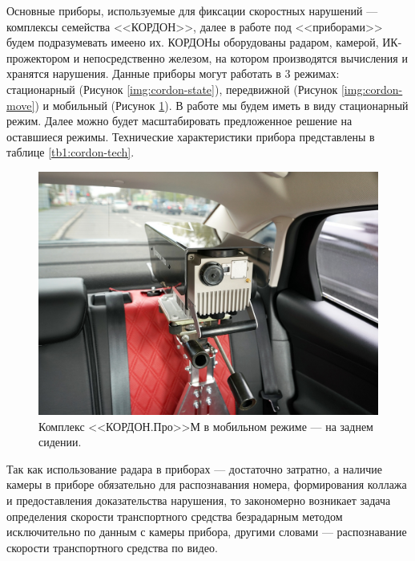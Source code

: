 \documentclass[specification,annotation,times]{itmo-student-thesis}
\begin{document}
	Основные приборы, используемые для фиксации скоростных нарушений --- комплексы семейства <<КОРДОН>>, далее в работе под <<приборами>> будем подразумевать имеено их. КОРДОНы оборудованы радаром, камерой, ИК-прожектором и непосредственно железом, на котором производятся вычисления и хранятся нарушения. Данные приборы могут работать в 3 режимах: стационарный (Рисунок \ref{img:cordon-state}), передвижной (Рисунок \ref{img:cordon-move}) и мобильный (Рисунок \ref{img:cordon-mobile}). В работе мы будем иметь в виду стационарный режим. Далее можно будет масштабировать предложенное решение на оставшиеся режимы. Технические характеристики прибора представлены в таблице \ref{tb1:cordon-tech}.
	
	\begin{figure}[!ht]
		\caption{Комплекс <<КОРДОН.Про>>М в мобильном режиме --- на заднем сидении.}\label{img:cordon-mobile}
		\includegraphics[width=0.85\linewidth]{../png/cordon_pro_d_auto.jpg}
		\centering
	\end{figure}
	
	Так как использование радара в приборах --- достаточно затратно, а наличие камеры в приборе обязательно для распознавания номера, формирования коллажа и предоставления доказательства нарушения, то закономерно возникает задача определения скорости транспортного средства безрадарным методом исключительно по данным с камеры прибора, другими словами --- распознавание скорости транспортного средства по видео.
	
\end{document}
